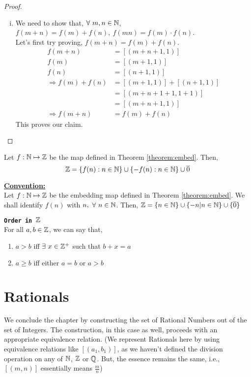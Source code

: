 \documentclass[11pt]{scrartcl}
\begin{document}
\begin{proof}
\begin{enumerate}[i)]
		\item We need to show that, $\forall\ m,n \in \mathbb N$, $f(m+n)= f(m)+f(n),\ f(mn) = f(m)\cdot f(n)$.\\
		Let's first try proving,  $f(m+n)= f(m)+f(n)$.
		\begin{align*}
			f(m+n) &= [(m+n+1,1)]\\
			f(m) &= [(m+1,1)]\\
			f(n) &= [(n+1, 1)]\\
			\Rightarrow f(m)+f(n) &= [(m+1,1)] + [(n+1, 1)]\\
			&= [(m+n+1+1,1+1)]\\
			&= [(m+n+1,1)]\\
			\Rightarrow f(m+n) &= f(m) + f(n)
		\end{align*}
	This proves our claim.
		\end{enumerate}
	\end{proof}

	\begin{corollary}
		Let $f: \mathbb N \mapsto \mathbb Z$ be the map defined in Theorem \ref{theorem:embed}. Then,
		$$\mathbb Z = \{f(n):n \in \mathbb N\} \cup \{-f(n):n \in \mathbb N\} \cup \overline{0}$$
	\end{corollary}
	\textbf{\underline{Convention: }}\\
 	Let $f: \mathbb N \mapsto \mathbb Z$ be the embedding map defined in Theorem \ref{theorem:embed}. We shall identify $f(n)$ with $n,\ \forall\ n \in \mathbb N$. Then, $\mathbb Z = \{n \in \mathbb N\} \cup \{-n|n \in \mathbb N\} \cup \{\overline{0}\}$
 	
 	\begin{theorem}
 		\texttt{\textbf{Order in $\mathbb Z$}}\\
 		For all $a,b \in \mathbb Z$, we can say that,
 		{\color{Red}
 		\begin{enumerate}
 			\item $a>b$ iff $\exists\ x\in \mathbb Z^{+}$ such that $b+x = a$
 			\item $a \geq b$ iff either $a=b$ or $a>b$
 		\end{enumerate}
 		}
 	\end{theorem}
 
 \section{Rationals}
 
 We conclude the chapter by constructing the set of Rational Numbers out of the set of Integers. The construction, in this case as well, proceeds with an appropriate equivalence relation. (We represent Rationals here by using equivalence relations like $[(a_{1}, b_{1})]$, as we haven't defined the division operation on any of $\mathbb N$, $\mathbb Z$ or $\mathbb Q$. But, the essence remains the same, i.e., $[(m,n)]$ essentially means $\frac{m}{n}$)
 
\end{document}
